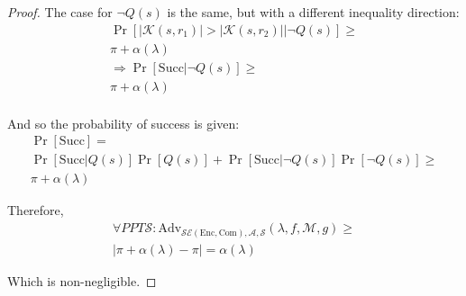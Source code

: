 \begin{proof}
The case for $\lnot Q(s)$ is the same, but with a different inequality direction:
\begin{align*}
    \Pr[|\mathcal{K}(s, r_1)| > |\mathcal{K}(s, r_2)||\lnot Q(s)]
        \geq\\
        \pi + \alpha(\lambda)\\
    \Rightarrow \Pr[\text{Succ}|\lnot Q(s)] \geq\\
    \pi + \alpha(\lambda)\\
\end{align*}

And so the probability of success is given:
\begin{align*}
    \Pr[\text{Succ}] =\\
    \Pr[\text{Succ}|Q(s)]\Pr[Q(s)]
    +
    \Pr[\text{Succ}|\lnot Q(s)]\Pr[\lnot Q(s)] \geq\\
    \pi + \alpha(\lambda)
\end{align*}

Therefore,
\begin{align*}
    \forall PPT \mathcal{S}:
    \text{Adv}_{\mathcal{SE}(\textrm{Enc}, \textrm{Com}), \mathcal{A}, \mathcal{S}}
        (\lambda, f, \mathcal{M}, g)
    \geq\\
    |\pi + \alpha(\lambda) - \pi| = \alpha(\lambda)
\end{align*}

Which is non-negligible.

\end{proof}

\begin{lemma}[Amplification]
\end{lemma}

